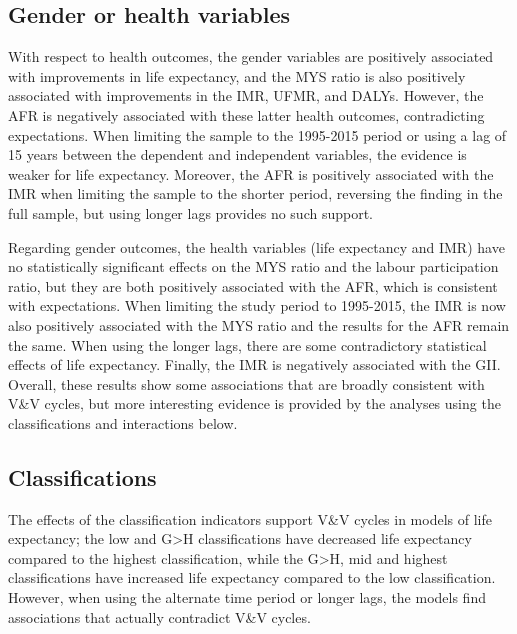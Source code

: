 \documentclass[12pt]{article}
\begin{document}
\subsection{Gender or health variables}

With respect to health outcomes, the gender variables are positively associated with improvements in life expectancy, and the MYS ratio is also positively associated with improvements in the IMR, UFMR, and DALYs. However, the AFR is negatively associated with these latter health outcomes, contradicting expectations. When limiting the sample to the 1995-2015 period or using a lag of 15 years between the dependent and independent variables, the evidence is weaker for life expectancy. Moreover, the AFR is positively associated with the IMR when limiting the sample to the shorter period, reversing the finding in the full sample, but using longer lags provides no such support.

Regarding gender outcomes, the health variables (life expectancy and IMR) have no statistically significant effects on the MYS ratio and the labour participation ratio, but they are both positively associated with the AFR, which is consistent with expectations. When limiting the study period to 1995-2015, the IMR is now also positively associated with the MYS ratio and the results for the AFR remain the same. When using the longer lags, there are some contradictory statistical effects of life expectancy. Finally, the IMR is negatively associated with the GII. Overall, these results show some associations that are broadly consistent with V\&V cycles, but more interesting evidence is provided by the analyses using the classifications and interactions below.

\subsection{Classifications}

The effects of the classification indicators support V\&V cycles in models of life expectancy; the low and G>H classifications have decreased life expectancy compared to the highest classification, while the G>H, mid and highest classifications have increased life expectancy compared to the low classification. However, when using the alternate time period or longer lags, the models find associations that actually contradict V\&V cycles.
\end{document}

